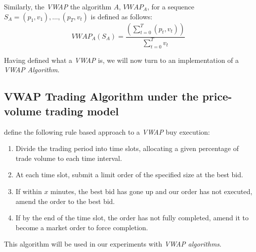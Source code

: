 Similarly, the \textit{VWAP} the algorithm $A$, $VWAP_A$, for a sequence $S_A = (p_1, v_1), \ldots, (p_T, v_t)$ is defined as follows:
\begin{equation}  
\label{Equation/Algo-Vwap}
VWAP_A(S_A) = \frac{\left( \displaystyle\sum\limits_{t=0}^T (p_t, v_t) \right)}{\displaystyle\sum\limits_{t=0}^T v_t}
\end{equation}

Having defined what a \textit{VWAP} is, we will now turn to an implementation of a \textit{VWAP Algorithm}.

\subsection{VWAP Trading Algorithm under the price-volume trading model}
\citet{Coggins2006} define the following rule based approach to a \textit{VWAP} buy execution:
\begin{enumerate}
\item Divide the trading period into time slots, allocating a given percentage of trade volume to each time interval.
\item At each time slot, submit a limit order of the specified size at the best bid.
\item If within $x$ minutes, the best bid has gone up and our order has not executed, amend the order to the best bid.
\item If by the end of the time slot, the order has not fully completed, amend it to become a market order to force completion.
\end{enumerate}

This algorithm will be used in our experiments with \textit{VWAP algorithms}.




